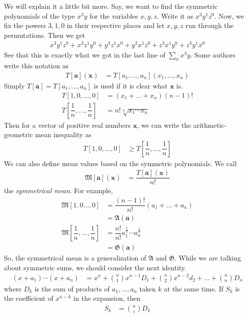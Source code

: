 \documentclass{subfile}
\begin{document}
	We will explain it a little bit more. Say, we want to find the symmetric polynomials of the type $x^{3}y$ for the variables $x,y,z$. Write it as $x^{3}y^{1}z^{0}$. Now, we fix the powers $3,1,0$ in their respective places and let $x,y,z$ run through the permutations. Then we get
		\begin{align*}
			x^{3}y^{1}z^{0}+x^{3}z^{1}y^{0}+y^{3}z^{1}x^{0}+y^{3}x^{1}z^{0}+z^{3}x^{1}y^{0}+z^{3}y^{1}x^{0}
		\end{align*}
	See that this is exactly what we got in the last line of $\sum_{\sigma}x^{3}y$. Some authors write this notation as
		\begin{align*}
			T[\mathbf{a}](\mathbf{x})
				& = T[a_{1},\ldots,a_{n}](x_{1},\ldots,x_{n})
		\end{align*}
	Simply $T[\mathbf{a}]=T[a_{1},\ldots,a_{n}]$ is used if it is clear what $\mathbf{x}$ is.
		\begin{align*}
			T[1,0,\ldots,0]
				& = (x_{1}+\ldots+x_{n})(n-1)!\\
			T\left[\dfrac{1}{n},\ldots,\dfrac{1}{n}\right]
				& = n!\sqrt[n]{x_{1}\cdots x_{n}}
		\end{align*}
	Then for a vector of positive real numbers $\mathbf{x}$, we can write the arithmetic-geometric mean inequality as
		\begin{align*}
			T[1,0,\ldots,0]
				& \geq T\left[\dfrac{1}{n},\ldots,\dfrac{1}{n}\right]
		\end{align*}
	We can also define mean values based on the symmetric polynomials. We call
		\begin{align*}
			\mathfrak{M}[\mathbf{a}](\mathbf{x})
				& = \dfrac{T[\mathbf{a}](\mathbf{x})}{n!}
		\end{align*}
	the \textit{symmetrical mean}. For example,
		\begin{align*}
			\mathfrak{M}[1,0\ldots,0]
				& = \dfrac{(n-1)!}{n!}(a_{1}+\ldots+a_{n})\\
				& = \mathfrak{A}(\mathbf{a})\\
			\mathfrak{M}\left[\dfrac{1}{n},\ldots,\dfrac{1}{n}\right]
				& = \dfrac{n!}{n!}a_{1}^{\frac{1}{n}}\cdots a_{n}^{\frac{1}{n}}\\
				& = \mathfrak{G}(\mathbf{a})
		\end{align*}
	So, the symmetrical mean is a generalization of $\mathfrak{A}$ and $\mathfrak{G}$. While we are talking about symmetric sums, we should consider the next identity.
		\begin{align*}
			(x+a_{1})\cdots(x+a_{n})
				& = x^{n}+\binom{n}{1}x^{n-1}D_{1}+\binom{n}{2}x^{n-2}d_{2}+\ldots+\binom{n}{n}D_{n}
		\end{align*}
	where $D_{k}$ is the sum of products of $a_{1},\ldots,a_{n}$ taken $k$ at the same time. If $S_{k}$ is the coefficient of $x^{n-k}$ in the expansion, then
		\begin{align*}
			S_{k}
				& = \binom{n}{i}D_{k}
		\end{align*}
\end{document}
